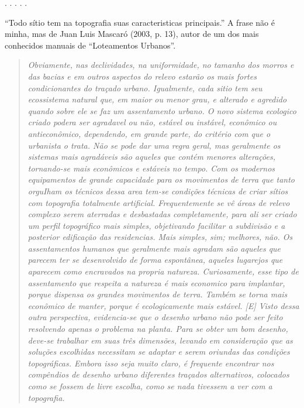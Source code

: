 \documentclass[12pt, a4paper]{book} %
\begin{document}
        \begin{center}
        . . . . .
        \end{center} 

            ``Todo sítio tem na topografia suas caracteristicas principais.'' A frase não é minha, mas de Juan Luis Mascaró (2003, p. 13), autor de um dos mais conhecidos manuais de ``Loteamentos Urbanos''.

            \begin{quotation} 
                \textit{Obviamente, nas declividades, na uniformidade, no tamanho dos morros e das bacias e em outros aspectos do relevo estarão os mais fortes condicionantes do traçado urbano.
                Igualmente, cada sitio tem seu ecossistema natural que, em maior ou menor grau, e alterado e agredido quando sobre ele se faz um assentamento urbano. O novo sistema ecologico criado podera ser agradavel ou não, estável ou instável, econômico ou antieconômico, dependendo, em grande parte, do critério com que o urbanista o trata.
                Não se pode dar uma regra geral, mas geralmente os sistemas mais agradáveis são aqueles que contém menores alterações, tornando-se mais econômicos e estáveis no tempo.
                Com os modernos equipamentos de grande capacidade para os movimentos de terra que tanto orguIham os técnicos dessa area tem-se condições técnicas de criar sítios com topografia totalmente artificial. Frequentemente se vê áreas de relevo complexo serem aterradas e desbastadas completamente, para ali ser criado um perfil topográfico mais simples, objetivando facilitar a subdivisão e a posterior edificação das residencias. Mais simples, sim; melhores, não. 
                Os assentamentos humanos que geralmente mais agradam são aqueles que parecem ter se desenvolvido de forma espontânea, aqueles lugarejos que aparecem como encravados na propria natureza. Curiosamente, esse tipo de assentamento que respeita a natureza é mais economico para implantar, porque dispensa os grandes movimentos de terra. Também se torna mais econômico de manter, porque é ecologicamente mais estável. 
                [E] Visto dessa outra perspectiva, evidencia-se que o desenho urbano não pode ser feito resolvendo apenas o problema na planta. Para se obter um bom desenho, deve-se trabalhar em suas três dimensões, levando em consideração que as soluções escolhidas necessitam se adaptar e serem oriundas das condições topográficas. 
                Embora isso seja muito claro, é frequente encontrar nos compêndios de desenho urbano diferentes traçados alternativos, colocados como se fossem de livre escolha, como se nada tivessem a ver com a topografia.}
            \end{quotation}
\end{document}
